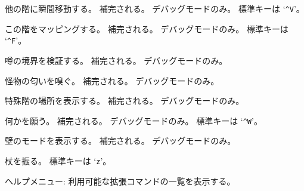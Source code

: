 他の階に瞬間移動する。
補完される。
デバッグモードのみ。
標準キーは `{\tt \^{}V}'。
\item[\tb{\#wizmap}]
この階をマッピングする。
補完される。
デバッグモードのみ。
標準キーは `{\tt \^{}F}'。
\item[\tb{\#wizrumorcheck}]
噂の境界を検証する。
補完される。
デバッグモードのみ。
\item[\tb{\#wizsmell}]
怪物の匂いを嗅ぐ。
補完される。
デバッグモードのみ。
\item[\tb{\#wizwhere}]
特殊階の場所を表示する。
補完される。
デバッグモードのみ。
\item[\tb{\#wizwish}]
何かを願う。
補完される。
デバッグモードのみ。
標準キーは `{\tt \^{}W}'。
\item[\tb{\#wmode}]
壁のモードを表示する。
補完される。
デバッグモードのみ。
\item[\tb{\#zap}]
杖を振る。
標準キーは `{\tt z}'。
\item[\tb{\#?}]
ヘルプメニュー: 利用可能な拡張コマンドの一覧を表示する。
\elist

